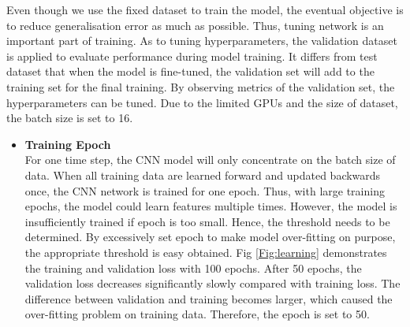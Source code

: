 Even though we use the fixed dataset to train the model, the eventual objective is to reduce generalisation error as much as possible. Thus, tuning network is an important part of training. As to tuning hyperparameters, the validation dataset is applied to evaluate performance during model training. It differs from test dataset that when the model is fine-tuned, the validation set will add to the training set for the final training. By observing metrics of the validation set, the hyperparameters can be tuned. Due to the limited GPUs and the size of dataset, the batch size is set to 16. 
\begin{itemize}[leftmargin=*]
	\item \textbf{Training Epoch}\\
	For one time step, the CNN model will only concentrate on the batch size of data. When all training data are learned forward and updated backwards once, the CNN network is trained for one epoch. Thus, with large training epochs, the model could learn features multiple times. However, the model is insufficiently trained if epoch is too small. Hence, the threshold needs to be determined. By excessively set epoch to make model over-fitting on purpose, the appropriate threshold is easy obtained. Fig \ref{Fig:learning} demonstrates the training and validation loss with 100 epochs. After 50 epochs, the validation loss decreases significantly slowly compared with training loss. The difference between validation and training becomes larger, which caused the over-fitting problem on training data. Therefore, the epoch is set to 50.
	\begin{figure}[htp]
	\centering

\end{figure}
\end{itemize}
